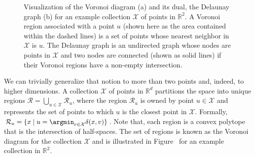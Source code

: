 \begin{figure}[t]
    \centering
    \caption{Visualization of the Voronoi diagram (a) and its dual, the Delaunay graph (b)
    for an example collection $\mathcal{X}$ of points in $\mathbb{R}^2$.
    A Voronoi region associated with a point $u$
    (shown here as the area contained within the dashed lines)
    is a set of points whose nearest neighbor in $\mathcal{X}$
    is $u$. The Delaunay graph is an undirected graph whose nodes are points in $\mathcal{X}$ and two nodes
    are connected (shown as solid lines) if their Voronoi regions have a non-empty intersection.}
    \label{figure:graphs:delaunay}
\end{figure}

We can trivially generalize that notion to more than two points and, indeed, to higher dimensions.
A collection $\mathcal{X}$ of points in $\mathbb{R}^d$ partitions the space
into unique regions $\mathcal{R} = \bigcup_{u \in \mathcal{X}} \mathcal{R}_u$,
where the region $\mathcal{R}_u$ is owned by point
$u \in \mathcal{X}$ and represents the set of points to which $u$ is the closest
point in $\mathcal{X}$. Formally, $\mathcal{R}_u = \{ x \;|\; u = \argmin_{v \in \mathcal{X}} \delta(x, v) \}$. Note that, each region is a convex polytope that is the intersection of
half-spaces.
The set of regions is known as the Voronoi diagram for the collection $\mathcal{X}$ and is
illustrated in Figure~ for an example collection in $\mathbb{R}^2$.

